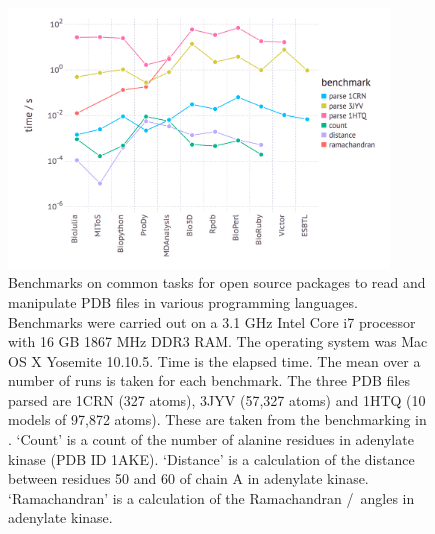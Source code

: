 \begin{figure}
\centering

\includegraphics[width=0.9\textwidth]{figures/pdb_benchmarks/pdb_benchmarks}

\caption[Benchmarks on common tasks for open source packages to read and manipulate PDB files in various programming languages]
{Benchmarks on common tasks for open source packages to read and manipulate PDB files in various programming languages.
Benchmarks were carried out on a 3.1 GHz Intel Core i7 processor with 16 GB 1867 MHz DDR3 RAM.
The operating system was Mac OS X Yosemite 10.10.5.
Time is the elapsed time.
The mean over a number of runs is taken for each benchmark.
The three PDB files parsed are 1CRN (327 atoms), 3JYV (57,327 atoms) and 1HTQ (10 models of 97,872 atoms).
These are taken from the benchmarking in \cite{Gajda2013}.
`Count' is a count of the number of alanine residues in adenylate kinase (PDB ID 1AKE).
`Distance' is a calculation of the distance between residues 50 and 60 of chain A in adenylate kinase.
`Ramachandran' is a calculation of the Ramachandran \textphi /\textpsi\ angles in adenylate kinase.}

\label{fig:pdb_benchmarks}
\end{figure}
